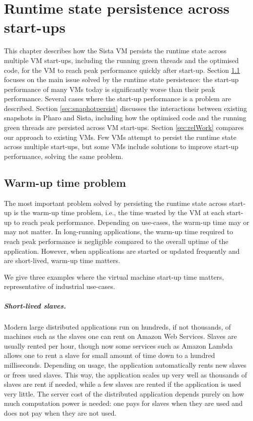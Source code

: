 \documentclass[a4paper,12pt,twoside]{../includes/ThesisStyle}
\begin{document}
\fi

\chapter{Runtime state persistence across start-ups}
\label{chap:persistence}
\minitoc

This chapter describes how the Sista VM persists the runtime state across multiple VM start-ups, including the running green threads and the optimised code, for the VM to reach peak performance quickly after start-up. Section \ref{sec:warmup} focuses on the main issue solved by the runtime state persistence: the start-up performance of many VMs today is significantly worse than their peak performance. Several cases where the start-up performance is a problem are described. Section \ref{sec:snaphotpersist} discusses the interactions between existing snapshots in Pharo and Sista, including how the optimised code and the running green threads are persisted across VM start-ups. Section \ref{sec:relWork} compares our approach to existing VMs. Few VMs attempt to persist the runtime state across multiple start-ups, but some VMs include solutions to improve start-up performance, solving the same problem.

\section{Warm-up time problem}
\label{sec:warmup}

The most important problem solved by persisting the runtime state across start-up is the warm-up time problem, i.e., the time wasted by the VM at each start-up to reach peak performance. Depending on use-cases, the warm-up time may or may not matter. In long-running applications, the warm-up time required to reach peak performance is negligible compared to the overall uptime of the application. However, when applications are started or updated frequently and are short-lived, warm-up time matters.

We give three examples where the virtual machine start-up time matters, representative of industrial use-cases.

\paragraph{Short-lived slaves.}
Modern large distributed applications run on hundreds, if not thousands, of machines such as the slaves one can rent on Amazon Web Services. Slaves are usually rented per hour, though now some services such as Amazon Lambda allows one to rent a slave for small amount of time down to a hundred milliseconds. Depending on usage, the application automatically rents new slaves or frees used slaves. This way, the application scales up very well as thousands of slaves are rent if needed, while a few slaves are rented if the application is used very little. The server cost of the distributed application depends purely on how much computation power is needed: one pays for slaves when they are used and does not pay when they are not used.
\end{document}
